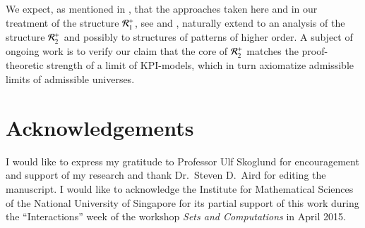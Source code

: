 \documentclass[3p,10pt,times]{elsarticle}
\newcommand{\Ronepl}{{{\cal R}_1^+}}
\newcommand{\Rtwopl}{{{\cal R}_2^+}}
\begin{document}
We expect, as mentioned in \cite{W}, that the approaches taken here and in our treatment of the structure $\Ronepl$, 
see \cite{W07b} and \cite{W07c}, naturally extend to an analysis of the structure $\Rtwopl$ and possibly to structures 
of patterns of higher order.
A subject of ongoing work is to verify our claim that the core of $\Rtwopl$ matches the proof-theoretic strength of a limit of 
$\mathrm{KPI}$-models, which in turn axiomatize admissible limits of admissible universes.  

\section*{Acknowledgements}
I would like to express my gratitude to Professor Ulf Skoglund for encouragement and support of my research and
thank Dr.\ Steven D.\ Aird for editing the manuscript. 
I would like to acknowledge the Institute for Mathematical Sciences of the National University of Singapore
for its partial support of this work during the ``Interactions'' week of the workshop {\it Sets and Computations} in April 2015.

\printindex
\end{document}

